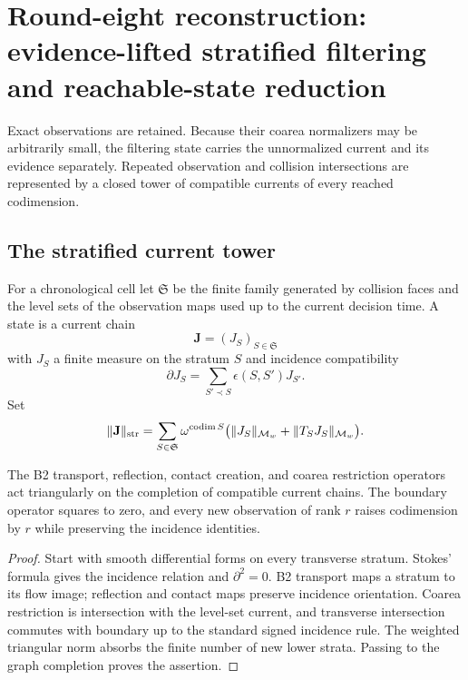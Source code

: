 \section{Round-eight reconstruction: evidence-lifted stratified filtering and reachable-state reduction}
\label{sec:r8-c1}

Exact observations are retained.  Because their coarea normalizers may be
arbitrarily small, the filtering state carries the unnormalized current and
its evidence separately.  Repeated observation and collision intersections
are represented by a closed tower of compatible currents of every reached
codimension.

\subsection{The stratified current tower}

For a chronological cell let $\mathfrak S$ be the finite family generated by
collision faces and the level sets of the observation maps used up to the
current decision time.  A state is a current chain
\[
 \mathbf J=(J_S)_{S\in\mathfrak S}
\]
with $J_S$ a finite measure on the stratum $S$ and incidence compatibility
\[
 \partial J_S=\sum_{S'\prec S}\epsilon(S,S')J_{S'}.
\]
Set
\[
 \|\mathbf J\|_{\rm str}
 =\sum_{S\in\mathfrak S}\omega^{\operatorname{codim}S}
 \bigl(\|J_S\|_{\mathcal M_w}+
 \|T_SJ_S\|_{\mathcal M_w}\bigr).
\]

\begin{lemma}
\label{lem:r8-c1-tower}
The B2 transport, reflection, contact creation, and coarea restriction operators
act triangularly on the completion of compatible current chains.  The boundary
operator squares to zero, and every new observation of rank $r$ raises
codimension by $r$ while preserving the incidence identities.
\end{lemma}

\begin{proof}
Start with smooth differential forms on every transverse stratum.  Stokes'
formula gives the incidence relation and $\partial^2=0$.  B2 transport maps a
stratum to its flow image; reflection and contact maps preserve incidence
orientation.  Coarea restriction is intersection with the level-set current,
and transverse intersection commutes with boundary up to the standard signed
incidence rule.  The weighted triangular norm absorbs the finite number of
new lower strata.  Passing to the graph completion proves the assertion.
\end{proof}

